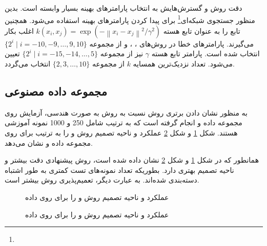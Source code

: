 دقت روش  و گسترش‌هایش به انتخاب پارامترهای بهینه بسیار وابسته است. بدین منظور جستجوی شبکه‌ای\footnote{}  برای پیدا کردن پارامترهای بهینه استفاده می‌شود. همچنین تابع  را به عنوان تابع هسته  $k(x_i, x_j)=\exp({-\left\|x_i - x_j\right\|^2}/\gamma^2)$ اغلب بکار می‌گیرند. پارامترهای خطا در روش‌های ، ،  و  از مجموعه  $\{2^i \mid i=-10, -9, \dots, 9, 10\}$ انتخاب شده است.  پارامتر تابع هسته $\gamma$  نیز از مجموعه  $\{2^i \mid i=-15, -14, \dots, 5\}$ تعیین می‌شود. تعداد نزدیک‌ترین همسایه  $k$ از مجموعه  $\{2,3, \dots, 10\}$ انتخاب می‌گردد.

\subsection{مجموعه داده مصنوعی}\label{sec:5:2:2}
به منظور نشان دادن برتری روش  نسبت به روش  به صورت هندسی، آزمایش روی مجموعه داده   \cite{ripley2007} و  \cite{ho1996} انجام گرفته است که به ترتیب شامل 250 و 1000 نمونه آموزشی هستند. شکل ‏\ref{fig:LSTSVM-vs-KNN-LSTSVM-R} و شکل \ref{fig:LSTSVM-vs-KNN-LSTSVM-C} عملکرد و ناحیه تصمیم روش  و  را به ترتیب برای روی مجموعه داده  و  نشان می‌دهد.

همانطور که در شکل ‏\ref{fig:LSTSVM-vs-KNN-LSTSVM-R} و شکل ‏\ref{fig:LSTSVM-vs-KNN-LSTSVM-C} نشان داده شده است، روش پیشنهادی  دقت بیشتر و ناحیه تصمیم بهتری دارد. بطوریکه تعداد نمونه‌های تست کمتری به طور اشتباه دسته‌بندی شده‌اند. به عبارت دیگر، تعمیم‌پذیری روش  بیشتر است.

\begin{figure}[!t]
	\centering
	\caption{عملکرد و ناحیه تصمیم روش   و   را برای روی داده  }
		\label{fig:LSTSVM-vs-KNN-LSTSVM-R}
\end{figure}

\begin{figure}[!ht]
	\centering
	\caption{عملکرد و ناحیه تصمیم روش   و   را برای روی داده  }
	\label{fig:LSTSVM-vs-KNN-LSTSVM-C}
\end{figure}

